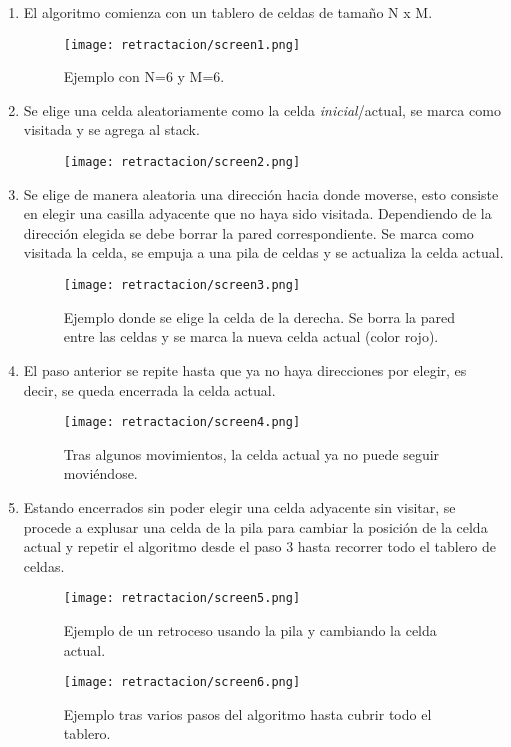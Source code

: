 \begin{enumerate}
  \item El algoritmo comienza con un tablero de celdas de tamaño N x M.
    \begin{figure}[h!]
      \centering
      \texttt{[image: retractacion/screen1.png]}
      \caption{Ejemplo con N=6 y M=6.}
      \label{fig:tablero1}
    \end{figure}
    
  \item Se elige una celda aleatoriamente como la celda \textit{inicial}/actual, se marca como visitada y se agrega al stack.
    \begin{figure}[h!]
      \centering
      \texttt{[image: retractacion/screen2.png]}
      \caption{}
      \label{fig:tablero2}
    \end{figure}
    
  \item Se elige de manera aleatoria una dirección hacia donde moverse, esto consiste en elegir una casilla adyacente que no haya sido visitada. Dependiendo de la dirección elegida se debe borrar la pared correspondiente. Se marca como visitada la celda, se empuja a una pila de celdas y se actualiza la celda actual.
    \pagebreak
    \begin{figure}[h!]
      \centering
      \texttt{[image: retractacion/screen3.png]}
      \caption{Ejemplo donde se elige la celda de la derecha. Se borra la pared entre las celdas y se marca la nueva celda actual (color rojo).}
      \label{fig:tablero3}
    \end{figure}
    
  \item El paso anterior se repite hasta que ya no haya direcciones por elegir, es decir, se queda encerrada la celda actual.
    \begin{figure}[h!]
      \centering
      \texttt{[image: retractacion/screen4.png]}
      \caption{Tras algunos movimientos, la celda actual ya no puede seguir moviéndose.}
      \label{fig:tablero4}
    \end{figure}
    
  \item Estando encerrados sin poder elegir una celda adyacente sin visitar, se procede a explusar una celda de la pila para cambiar la posición de la celda actual y repetir el algoritmo desde el paso 3 hasta recorrer todo el tablero de celdas.
    \begin{figure}[h!]
      \centering
      \texttt{[image: retractacion/screen5.png]}
      \caption{Ejemplo de un retroceso usando la pila y cambiando la celda actual.}
      \label{fig:tablero5}
    \end{figure}
    \pagebreak
    \begin{figure}[h!]
      \centering
      \texttt{[image: retractacion/screen6.png]}
      \caption{Ejemplo tras varios pasos del algoritmo hasta cubrir todo el tablero.}
      \label{fig:tablero6}
    \end{figure}
\end{enumerate}


